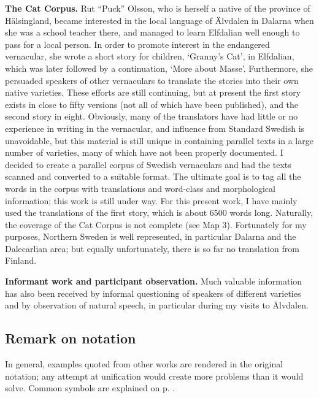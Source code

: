 \textbf{The Cat Corpus. }Rut “Puck” Olsson, who is herself a native of the province of Hälsingland, became interested in the local language of Älvdalen in Dalarna when she was a school teacher there, and managed to learn Elfdalian well enough to pass for a local person. In order to promote interest in the endangered vernacular, she wrote a short story for children,  ‘Granny’s Cat’, in Elfdalian, which was later followed by a continuation,  ‘More about Masse’. Furthermore, she persuaded speakers of other vernaculars to translate the stories into their own native varieties. These efforts are still continuing, but at present the first story exists in close to fifty versions (not all of which have been published), and the second story in eight. Obviously, many of the translators have had little or no experience in writing in the vernacular, and influence from Standard Swedish is unavoidable, but this material is still unique in containing parallel texts in a large number of varieties, many of which have not been properly documented. I decided to create a parallel corpus of Swedish vernaculars and had the texts scanned and converted to a suitable format. The ultimate goal is to tag all the words in the corpus with translations and word-class and morphological information; this work is still under way. For this present work, I have mainly used the translations of the first story, which is about 6500 words long. Naturally, the coverage of the Cat Corpus is not complete (see Map 3). Fortunately for my purposes, Northern Sweden is well represented, in particular Dalarna and the Dalecarlian area; but equally unfortunately, there is so far no translation from Finland. 

\textbf{Informant work and participant observation. }Much\textbf{ }valuable information has also been received by informal questioning of speakers of different varieties and by observation of natural speech, in particular during my visits to Älvdalen. 

\subsection[Remark on notation]{\rmfamily Remark on notation}
In general, examples quoted from other works are rendered in the original notation; any attempt at unification would create more problems than it would solve. Common symbols are explained on p. \pageref{bkm:Ref224104485}.

